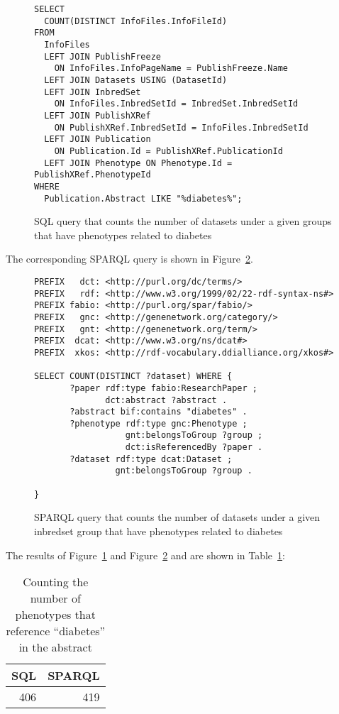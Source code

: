 \begin{figure}[H]
\centering
\begin{verbatim}
SELECT 
  COUNT(DISTINCT InfoFiles.InfoFileId) 
FROM 
  InfoFiles 
  LEFT JOIN PublishFreeze
    ON InfoFiles.InfoPageName = PublishFreeze.Name 
  LEFT JOIN Datasets USING (DatasetId)
  LEFT JOIN InbredSet
    ON InfoFiles.InbredSetId = InbredSet.InbredSetId 
  LEFT JOIN PublishXRef
    ON PublishXRef.InbredSetId = InfoFiles.InbredSetId 
  LEFT JOIN Publication
    ON Publication.Id = PublishXRef.PublicationId 
  LEFT JOIN Phenotype ON Phenotype.Id = PublishXRef.PhenotypeId 
WHERE 
  Publication.Abstract LIKE "%diabetes%";
\end{verbatim}
\caption{SQL query that counts the number of datasets under a given groups that have phenotypes related to diabetes}\label{sql:datasets-phenotypes-diabetes}
\end{figure}

The corresponding SPARQL query is shown in Figure~\ref{sparql:datasets-phenotypes-diabetes}.

\begin{figure}[H]
\centering
\begin{verbatim}
PREFIX   dct: <http://purl.org/dc/terms/>
PREFIX   rdf: <http://www.w3.org/1999/02/22-rdf-syntax-ns#>
PREFIX fabio: <http://purl.org/spar/fabio/>
PREFIX   gnc: <http://genenetwork.org/category/>
PREFIX   gnt: <http://genenetwork.org/term/>
PREFIX  dcat: <http://www.w3.org/ns/dcat#>
PREFIX  xkos: <http://rdf-vocabulary.ddialliance.org/xkos#>

SELECT COUNT(DISTINCT ?dataset) WHERE {
       ?paper rdf:type fabio:ResearchPaper ;
              dct:abstract ?abstract .
       ?abstract bif:contains "diabetes" .
       ?phenotype rdf:type gnc:Phenotype ;
                  gnt:belongsToGroup ?group ;
                  dct:isReferencedBy ?paper .
       ?dataset rdf:type dcat:Dataset ;
                gnt:belongsToGroup ?group .
                  
}
\end{verbatim}
\caption{SPARQL query that counts the number of datasets under a given inbredset group that have phenotypes related to diabetes}\label{sparql:datasets-phenotypes-diabetes}
\end{figure}

The results of Figure~\ref{sql:datasets-phenotypes-diabetes} and Figure~\ref{sparql:datasets-phenotypes-diabetes} and are shown in Table~\ref{table:datasets-phenotypes-diabetes}:

\begin{table}[H]
\begin{tabular}{rr}
SQL & SPARQL \\[0pt]
\toprule
406 & 419\\[0pt]
\end{tabular}
\caption{Counting the number of phenotypes that reference ``diabetes'' in the abstract}\label{table:datasets-phenotypes-diabetes}
\end{table}


